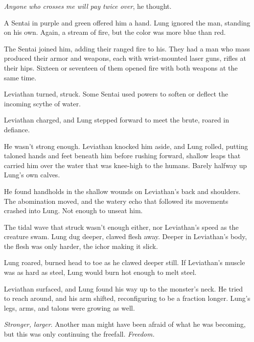 \emph{Anyone who crosses me will pay twice over}, he thought.



A Sentai in purple and green offered him a hand.  Lung ignored the man, standing on his own.  Again, a stream of fire, but the color was more blue than red.



The Sentai joined him, adding their ranged fire to his.  They had a man who mass produced their armor and weapons, each with wrist-mounted laser guns, rifles at their hips.  Sixteen or seventeen of them opened fire with both weapons at the same time.



Leviathan turned, struck.  Some Sentai used powers to soften or deflect the incoming scythe of water.



Leviathan charged, and Lung stepped forward to meet the brute, roared in defiance.



He wasn't strong enough.  Leviathan knocked him aside, and Lung rolled, putting taloned hands and feet beneath him before rushing forward, shallow leaps that carried him over the water that was knee-high to the humans.  Barely halfway up Lung's own calves.



He found handholds in the shallow wounds on Leviathan's back and shoulders.  The abomination moved, and the watery echo that followed its movements crashed into Lung.  Not enough to unseat him.



The tidal wave that struck wasn't enough either, nor Leviathan's speed as the creature swam.  Lung dug deeper, clawed flesh away.  Deeper in Leviathan's body, the flesh was only harder, the ichor making it slick.



Lung roared, burned head to toe as he clawed deeper still.  If Leviathan's muscle was as hard as steel, Lung would burn hot enough to melt steel.



Leviathan surfaced, and Lung found his way up to the monster's neck.  He tried to reach around, and his arm shifted, reconfiguring to be a fraction longer.  Lung's legs, arms, and talons were growing as well.



\emph{Stronger, larger}.  Another man might have been afraid of what he was becoming, but this was only continuing the freefall.  \emph{Freedom.}



